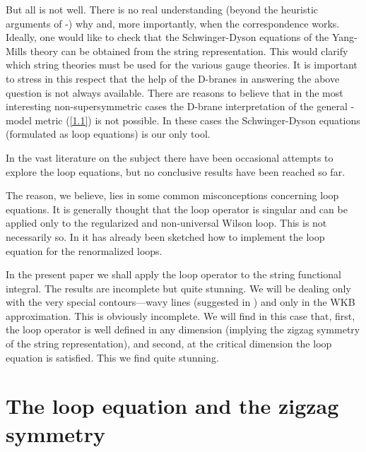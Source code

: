 \documentclass[a4paper,12pt]{article}
\numberwithin{equation}{section}
\begin{document}
But all is not well. There is no real understanding (beyond the heuristic arguments
of \cite{1}-\cite{5}) why and, more importantly, when the correspondence works.
Ideally, one would like to check that the Schwinger-Dyson equations of the Yang-Mills
theory can be obtained from the string representation. This would clarify which
string theories must be used for the various gauge theories. It is important
to stress in this respect that the help of the D-branes in answering the above
question is not always available. There are reasons to believe that in the most
interesting non-supersymmetric cases the D-brane interpretation of the general
\myHighlight{\( \sigma  \)}\coordHE{}-model metric (\ref{1.1}) is not possible. In these cases the
Schwinger-Dyson equations (formulated as loop equations) is our only tool.

In the vast literature on the subject there have been occasional attempts to
explore the loop equations, but no conclusive results have been reached so far.

The reason, we believe, lies in some common misconceptions concerning loop equations.
It is generally thought that the loop operator is singular and can be applied
only to the regularized and non-universal Wilson loop. This is not necessarily
so. In \cite{6} it has already been sketched how to implement the loop equation
for the renormalized loops.

In the present paper we shall apply the loop operator to the string functional
integral. The results are incomplete but quite stunning. We will be dealing
only with the very special contours---wavy lines (suggested in \cite{1}) and
only in the WKB approximation. This is obviously incomplete. We will find in
this case that, first, the loop operator is well defined in any dimension (implying
the zigzag symmetry of the string representation), and second, at the critical
dimension \coordHE{} the loop equation is satisfied. This we find
quite stunning.


\section{The loop equation and the zigzag symmetry}
\end{document}
